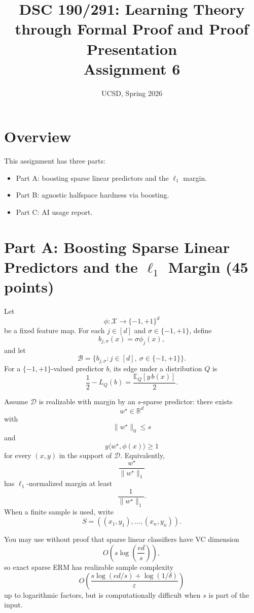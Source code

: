 \documentclass{article}
\title{DSC 190/291: Learning Theory through Formal Proof and Proof Presentation\\Assignment 6}
\date{UCSD, Spring 2026}
\begin{document}
\maketitle

\section{Overview}

This assignment has three parts:
\begin{itemize}
\item Part A: boosting sparse linear predictors and the $\ell_1$ margin.
\item Part B: agnostic halfspace hardness via boosting.
\item Part C: AI usage report.
\end{itemize}

\section{Part A: Boosting Sparse Linear Predictors and the $\ell_1$ Margin (45 points)}

Let
$$
\phi : \mathcal{X}\to \{-1,+1\}^d
$$
be a fixed feature map. For each $j\in[d]$ and $\sigma\in\{-1,+1\}$, define
$$
b_{j,\sigma}(x)=\sigma \phi_j(x),
$$
and let
$$
\mathcal{B}=\{b_{j,\sigma}:j\in[d],\ \sigma\in\{-1,+1\}\}.
$$
For a $\{-1,+1\}$-valued predictor $b$, its edge under a distribution $Q$ is
$$
\frac12-L_Q(b)=\frac{\mathbb{E}_Q[y\,b(x)]}{2}.
$$

Assume $\mathcal{D}$ is realizable with margin by an $s$-sparse predictor: there exists
$$
w^\star\in\mathbb{R}^d
$$
with
$$
\|w^\star\|_0\le s
$$
and
$$
y\langle w^\star,\phi(x)\rangle \ge 1
$$
for every $(x,y)$ in the support of $\mathcal{D}$. Equivalently,
$$
\frac{w^\star}{\|w^\star\|_1}
$$
has $\ell_1$-normalized margin at least
$$
\frac{1}{\|w^\star\|_1}.
$$
When a finite sample is used, write
$$
S=((x_1,y_1),\dots,(x_n,y_n)).
$$

You may use without proof that sparse linear classifiers have VC dimension
$$
O\!\left(s\log\!\left(\frac{ed}{s}\right)\right),
$$
so exact sparse ERM has realizable sample complexity
$$
O\!\left(
\frac{
s\log(ed/s)+\log(1/\delta)
}{
\varepsilon
}
\right)
$$
up to logarithmic factors, but is computationally difficult when $s$ is part of the input.
\end{document}
